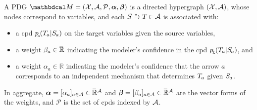 \documentclass[twoside]{article}
\begin{document}
\begin{defn}
    A PDG $\dg M = (\X, \Ar, \mathcal P, \balpha, \bbeta )
    $
    is a directed hypergraph  $(\mathcal X, \mathcal A)$, whose nodes correspond to variables, and
    each
    $\ed a{\Src {}}{\Tgt {}} \in \Ar$
    is associated with:
    \begin{itemize}[itemsep=0pt]
        \item a cpd $p\ssub a (\Tgt a | \Src a)$ on the target variables given the source variables,
        \item a weight $\beta_a \in \mskip1mu\overline{\mskip-1mu\mathbb R\!}\,$ indicating
            the modeler's confidence in the cpd $p\ssub L(\Tgt a | \Src a)$, and
        \item a weight $\alpha_a \in \mathbb R$ indicating
            the modeler's confidence that the arrow $a$ corresponds to an independent mechanism that determines $\Tgt a$ given $\Src a$.
    \end{itemize}
    In aggregate, $\boldsymbol\alpha = [\alpha_a]_{a \in \mathcal A} \in \mskip1mu\overline{\mskip-1mu\mathbb R\!}\,^\mathcal A$ and $\boldsymbol\beta = [\beta_a]_{a \in \mathcal A} \in \mskip1mu\overline{\mskip-1mu\mathbb R\!}\,^\mathcal A$ are the vector forms of the weights, and
    $\mathcal P$ is the set of cpds indexed by $\mathcal A$. 
\end{defn}
\end{document}
